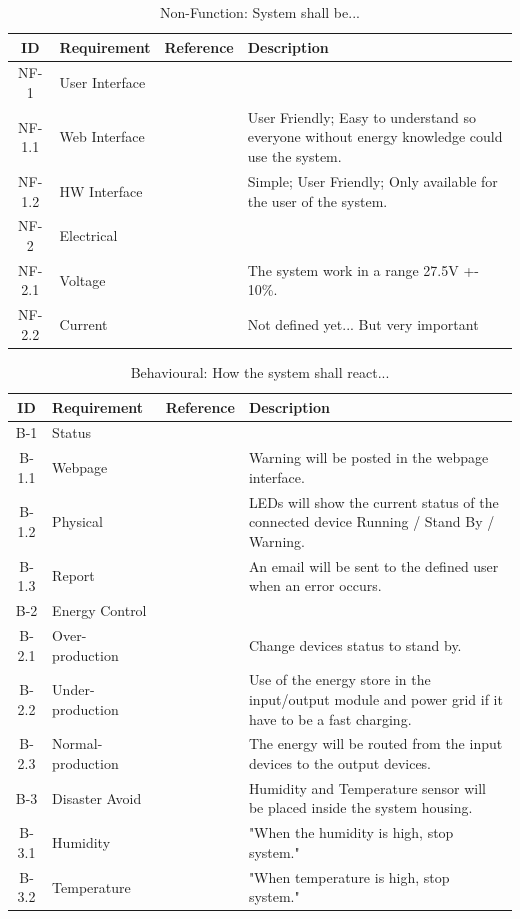 		\begin{table}[h!]
			\begin{tabular} [b] {| c |  p{3cm} | c | p{10cm} |}
			\hline
			\textbf{ID} & \textbf{Requirement} & \textbf{Reference} & \textbf{Description} \\\hline
			NF-1 & User Interface &  &  \\ \hline
			NF-1.1 & Web Interface &  & User Friendly; Easy to understand so everyone without energy knowledge could use the system. \\ \hline
			NF-1.2 & HW Interface &  & Simple; User Friendly; Only available for the user of the system. \\ \hline
			NF-2 & Electrical &  &  \\ \hline
			NF-2.1 & Voltage &  & The system work in a range 27.5V +-  10\%.\\ \hline
			NF-2.2 & Current &  & Not defined yet... But very important \\ \hline
		\end{tabular}
		\caption{Non-Function: System shall be...}
		\end{table}
		\newpage
		\begin{table}[h!]
			\begin{tabular} [b] {| c |  p{3cm} | c | p{10cm} |}
			\hline
			\textbf{ID} & \textbf{Requirement} & \textbf{Reference} & \textbf{Description} \\\hline
			B-1 & Status &  &  \\\hline
			B-1.1 & Webpage &  & Warning will be posted in the webpage interface. \\\hline
			B-1.2 & Physical &  & LEDs will show the current status of the connected device Running / Stand By / Warning. \\\hline
			B-1.3 & Report &  & An email will be sent to the defined user when an error occurs. \\\hline
			B-2 & Energy Control &  &  \\\hline
			B-2.1 & Over-production &  & Change devices status to stand by. \\\hline
			B-2.2 & Under-production &  & Use of the energy store in the input/output module and power grid if it have to be a fast charging. \\\hline
			B-2.3 & Normal-production &  & The energy will be routed from the input devices to the output devices. \\\hline
			B-3 & Disaster Avoid &  & Humidity and Temperature sensor will be placed inside the system housing. \\\hline
			B-3.1 & Humidity &  & "When the humidity is high, stop system." \\\hline
			B-3.2 & Temperature &  & "When temperature is high,  stop system." \\\hline
		\end{tabular}
		\caption{Behavioural: How the system shall react...}
		\end{table}
		
